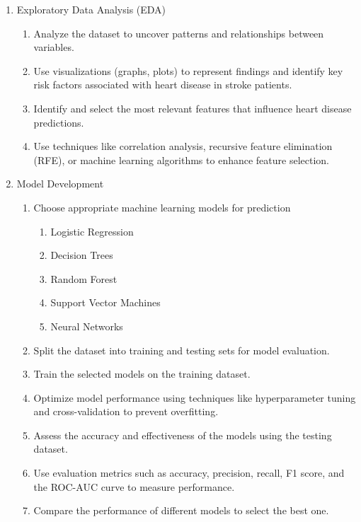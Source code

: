 \documentclass[runningheads]{llncs}
\begin{document}
\begin{enumerate}
\item  Exploratory Data Analysis (EDA)
    \begin{enumerate}
        \item Analyze the dataset to uncover patterns and relationships between variables. 
        \item Use visualizations (graphs, plots) to represent findings and identify key risk factors associated with heart disease in stroke patients. 
        \item Identify and select the most relevant features that influence heart disease predictions. 
        \item Use techniques like correlation analysis, recursive feature elimination (RFE), or machine learning algorithms to enhance feature selection. 
    \end{enumerate}
    
\item Model Development
    \begin{enumerate}
        \item Choose appropriate machine learning models for prediction 
            \begin{enumerate}
                \item Logistic Regression
                \item Decision Trees 
                \item Random Forest 
                \item Support Vector Machines 
                \item Neural Networks 
            \end{enumerate}
        \item Split the dataset into training and testing sets for model evaluation. 
        \item Train the selected models on the training dataset. 
        \item Optimize model performance using techniques like hyperparameter tuning and cross-validation to prevent overfitting. 
        \item Assess the accuracy and effectiveness of the models using the testing dataset. 
        \item Use evaluation metrics such as accuracy, precision, recall, F1 score, and the ROC-AUC curve to measure performance. 
        \item Compare the performance of different models to select the best one. 
\end{enumerate}


\end{enumerate}
\end{document}
